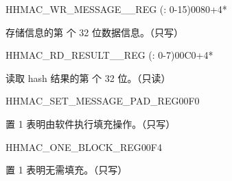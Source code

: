 \begin{register}{H}{HMAC\_WR\_MESSAGE\_\_REG (: 0-15)}{\hexprefix{}0080+4*}\label{regdesc:HMACWRMESSAGENREG}
%
\regnewline%
\begin{regdesc}\begin{reglist}
\label{fielddesc:HMACWDATAN}\item [HMAC\_WDATA\_\regindex{n}] 存储信息的第  个 32 位数据信息。（只写）
\end{reglist}\end{regdesc}
\end{register}


\begin{register}{H}{HMAC\_RD\_RESULT\_\_REG (: 0-7)}{\hexprefix{}00C0+4*}\label{regdesc:HMACRDRESULTNREG}
%
\regnewline%
\begin{regdesc}\begin{reglist}
\label{fielddesc:HMACRDATAN}\item [HMAC\_RDATA\_\regindex{n}] 读取 hash 结果的第  个 32 位。（只读）
\end{reglist}\end{regdesc}
\end{register}


\begin{register}{H}{HMAC\_SET\_MESSAGE\_PAD\_REG}{\hexprefix{}00F0}\label{regdesc:HMACSETMESSAGEPADREG}
%
%
\regnewline%
\begin{regdesc}\begin{reglist}
\label{fielddesc:HMACSETTEXTPAD}\item [HMAC\_SET\_TEXT\_PAD] 置 1 表明由软件执行填充操作。（只写）
\end{reglist}\end{regdesc}
\end{register}


\begin{register}{H}{HMAC\_ONE\_BLOCK\_REG}{\hexprefix{}00F4}\label{regdesc:HMACONEBLOCKREG}
%
%
\regnewline%
\begin{regdesc}\begin{reglist}
\label{fielddesc:HMACSETONEBLOCK}\item [HMAC\_SET\_ONE\_BLOCK] 置 1 表明无需填充。（只写）
\end{reglist}\end{regdesc}
\end{register}


